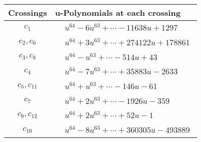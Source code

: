 \documentclass[1p]{elsarticle_modified}
\theoremstyle{definition}
\begin{document}
\begin{tabular}{m{50pt}|m{274pt}}
Crossings & \hspace{64pt}u-Polynomials at each crossing \\
\hline $$\begin{aligned}c_{1}\end{aligned}$$&$\begin{aligned}
&u^{64}-6 u^{63}+\cdots-11638 u+1297
\end{aligned}$\\
\hline $$\begin{aligned}c_{2},c_{6}\end{aligned}$$&$\begin{aligned}
&u^{64}+3 u^{63}+\cdots+274122 u+178861
\end{aligned}$\\
\hline $$\begin{aligned}c_{3},c_{8}\end{aligned}$$&$\begin{aligned}
&u^{64}- u^{63}+\cdots-514 u+43
\end{aligned}$\\
\hline $$\begin{aligned}c_{4}\end{aligned}$$&$\begin{aligned}
&u^{64}-7 u^{63}+\cdots+35883 u-2633
\end{aligned}$\\
\hline $$\begin{aligned}c_{5},c_{11}\end{aligned}$$&$\begin{aligned}
&u^{64}+u^{63}+\cdots-146 u-61
\end{aligned}$\\
\hline $$\begin{aligned}c_{7}\end{aligned}$$&$\begin{aligned}
&u^{64}+2 u^{63}+\cdots-1926 u-359
\end{aligned}$\\
\hline $$\begin{aligned}c_{9},c_{12}\end{aligned}$$&$\begin{aligned}
&u^{64}+2 u^{63}+\cdots+52 u-1
\end{aligned}$\\
\hline $$\begin{aligned}c_{10}\end{aligned}$$&$\begin{aligned}
&u^{64}-8 u^{63}+\cdots+360305 u-493889
\end{aligned}$\\
\hline
\end{tabular}\\~\\
\end{document}
